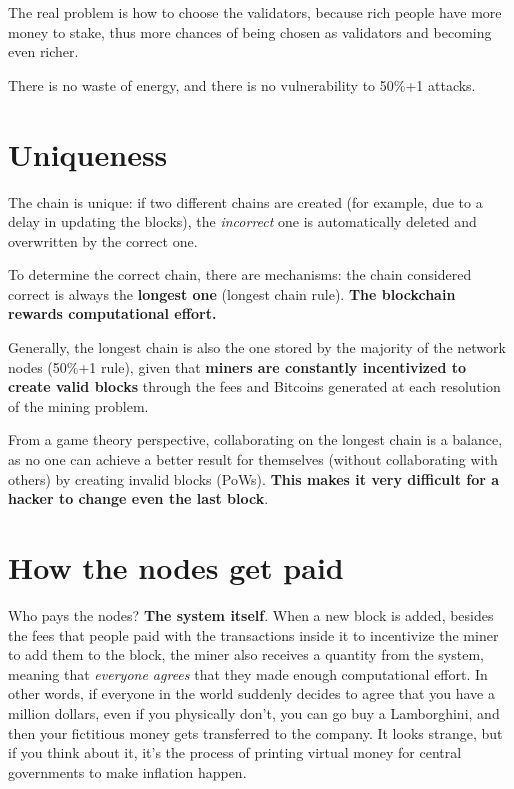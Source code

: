 The real problem is how to choose the validators, because rich people have more money to stake, thus more chances of being chosen as validators and becoming even richer.

There is no waste of energy, and there is no vulnerability to 50\%+1 attacks.

\section{Uniqueness}

The chain is unique: if two different chains are created (for example, due to a delay in updating the blocks), the \textit{incorrect} one is automatically deleted and overwritten by the correct one.

To determine the correct chain, there are mechanisms: the chain considered correct is always the \textbf{longest one} (longest chain rule). \textbf{The blockchain rewards computational effort.}

Generally, the longest chain is also the one stored by the majority of the network nodes (50\%+1 rule), given that \textbf{miners are constantly incentivized to create valid blocks} through the fees and Bitcoins generated at each resolution of the mining problem.

From a game theory perspective, collaborating on the longest chain is a balance, as no one can achieve a better result for themselves (without collaborating with others) by creating invalid blocks (PoWs). \textbf{This makes it very difficult for a hacker to change even the last block}.


\section{How the nodes get paid}

Who pays the nodes? \textbf{The system itself}. When a new block is added, besides the fees that people paid with the transactions inside it to incentivize the miner to add them to the block, the miner also receives a quantity from the system, meaning that \textit{everyone agrees} that they made enough computational effort. In other words, if everyone in the world suddenly decides to agree that you have a million dollars, even if you physically don't, you can go buy a Lamborghini, and then your fictitious money gets transferred to the company. It looks strange, but if you think about it, it's the process of printing virtual money for central governments to make inflation happen.

